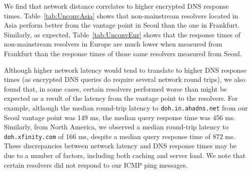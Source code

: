 We find that network distance correlates to higher encrypted DNS response
times.  Table~\ref{tab:UnconvAsia} shows that non-mainstream resolvers located
in Asia perform better from the vantage point in Seoul than the one in
Frankfurt.  Similarly, as expected, Table~\ref{tab:UnconvEur} shows that the
response times of non-mainstream resolvers in Europe are much lower when
measured from Frankfurt than the response times of those same resolvers
measured from Seoul.

Although higher network latency would tend to translate to higher DNS response
times (as encrypted DNS queries do require several network round trips), we
also found that, in some cases, certain resolvers performed worse than might
be expected as a result of the latency from the vantage point to the
resolvers. For example, although the median round-trip latency to
\texttt{doh.in.ahadns.net} from our Seoul vantage point was 149 ms, the
median query response time was 456 ms. Similarly, from North America, we
observed a median round-trip latency to \texttt{doh.xfinity.com} of
166 ms, despite a median query response time of 872 ms.
These discrepancies between network latency and DNS response times may be due 
to a number of factors, including both caching and server load.
We note that certain resolvers did not respond to our ICMP ping messages.


